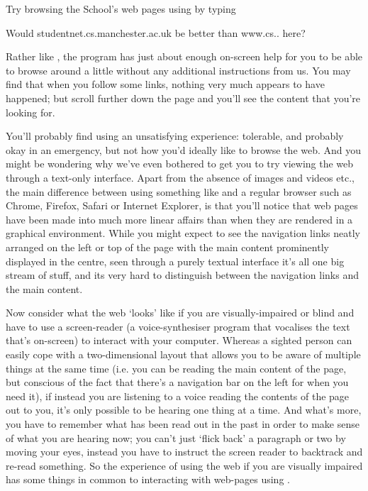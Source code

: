 

Try browsing the School's web pages using  by typing


\begin{note}
  Would studentnet.cs.manchester.ac.uk be better than www.cs.. here?
\end{note}

Rather like , the  program has just about enough on-screen help for you to be able to browse around a little without any additional instructions from us.  You may find that when you follow some links, nothing very much appears to have happened; but scroll further down the page and you'll see the content that you're looking for.

You'll probably find using  an unsatisfying experience: tolerable, and probably okay in an emergency, but not how you'd ideally like to browse the web. And you might be wondering why we've even bothered to get you to try viewing the web through a text-only interface. Apart from the absence of images and videos etc., the main difference between using something like  and a regular browser such as Chrome, Firefox, Safari or Internet Explorer, is that you'll notice that web pages have been made into much more linear affairs than when they are rendered in a graphical environment. While you might expect to see the navigation links neatly arranged on the left or top of the page with the main content prominently displayed in the centre, seen through a purely textual interface it's all one big stream of stuff, and its very hard to distinguish between the navigation links and the main content. 

Now consider what the web `looks' like if you are visually-impaired or blind and have to use a screen-reader (a voice-synthesiser program that vocalises the text that's on-screen) to interact with your computer. Whereas a sighted person can easily cope with a two-dimensional layout that allows you to be aware of multiple things at the same time (i.e. you can be reading the main content of the page, but conscious of the fact that there's a navigation bar on the left for when you need it), if instead you are listening to a voice reading the contents of the page out to you, it's only possible to be hearing one thing at a time. And what's more, you have to remember what has been read out in the past in order to make sense of what you are hearing now; you can't just `flick back' a paragraph or two by moving your eyes, instead you have to instruct the screen reader to backtrack and re-read something. So the experience of using the web if you are visually impaired has some things in common to interacting with web-pages using . 

